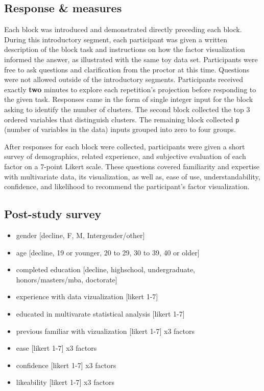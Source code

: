 \documentclass[]{article}
\providecommand{\tightlist}{%
  \setlength{\itemsep}{0pt}\setlength{\parskip}{0pt}}
\begin{document}
\hypertarget{sec:response}{%
\subsection{Response \& measures}\label{sec:response}}

Each block was introduced and demonstrated directly preceding each
block. During this introductory segment, each participant was given a
written description of the block task and instructions on how the factor
visualization informed the answer, as illustrated with the same toy data
set. Participants were free to ask questions and clarification from the
proctor at this time. Questions were not allowed outside of the
introductory segments. Participants received exactly \textbf{two}
minutes to explore each repetition's projection before responding to the
given task. Responses came in the form of single integer input for the
block asking to identify the number of clusters. The second block
collected the top 3 ordered variables that distinguish clusters. The
remaining block collected \texttt{p} (number of variables in the data)
inputs grouped into zero to four groups.

After responses for each block were collected, participants were given a
short survey of demographics, related experience, and subjective
evaluation of each factor on a 7-point Likert scale. These questions
covered familiarity and expertise with multivariate data, its
visualization, as well as, ease of use, understandability, confidence,
and likelihood to recommend the participant's factor visualization.

\hypertarget{sec:survey}{%
\subsection{Post-study survey}\label{sec:survey}}

\begin{itemize}
\tightlist
\item
  gender {[}decline, F, M, Intergender/other{]}
\item
  age {[}decline, 19 or younger, 20 to 29, 30 to 39, 40 or older{]}
\item
  completed education {[}decline, highschool, undergraduate,
  honors/masters/mba, doctorate{]}
\item
  experience with data vizualization {[}likert 1-7{]}
\item
  educated in multivarate statistical analysis {[}likert 1-7{]}
\item
  previous familiar with vizualization {[}likert 1-7{]} x3 factors
\item
  ease {[}likert 1-7{]} x3 factors
\item
  confidence {[}likert 1-7{]} x3 factors
\item
  likeability {[}likert 1-7{]} x3 factors 
\end{itemize}
\end{document}
